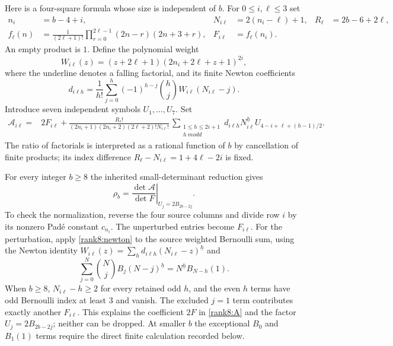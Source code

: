 \documentclass[11pt,letterpaper]{article}
\theoremstyle{definition}
\theoremstyle{remark}
\numberwithin{equation}{section}
\begin{document}
Here is a four-square formula whose size is independent of $b$.
For $0\le i,\ell\le3$ set
\begin{align*}
 n_i&=b-4+i,&N_{i\ell}&=2(n_i-\ell)+1,&R_\ell&=2b-6+2\ell,\\
 f_\ell(n)&=\frac1{(2\ell+1)!}
       \prod_{r=0}^{2\ell-1}(2n-r)(2n+3+r),&F_{i\ell}&=f_\ell(n_i).
\end{align*}
An empty product is $1$.  Define the polynomial weight
\[
 W_{i\ell}(z)=(z+2\ell+1)
                 (2n_i+2\ell+z+1)^{\underline{2i}},
\]
where the underline denotes a falling factorial, and its finite
Newton coefficients
\begin{equation}\label{rank8:newton}
 d_{i\ell h}=\frac1{h!}\sum_{j=0}^{h}
       (-1)^{h-j}\binom hj W_{i\ell}(N_{i\ell}-j).
\end{equation}
Introduce seven independent symbols $U_1,\ldots,U_7$.  Set
\begin{equation}\label{rank8:A}
 \begin{split}
 \mathcal A_{i\ell}={}&2F_{i\ell}+
 \frac{R_\ell!}
 {(2n_i+1)(2n_i+2)(2\ell+2)!N_{i\ell}!}\,
 \sum_{\substack{1\le h\le2i+1\\h\ {
m odd}}}
 d_{i\ell h}N_{i\ell}^{\underline h}
 U_{4-i+\ell+(h-1)/2}.
 \end{split}
\end{equation}
The ratio of factorials is interpreted as a rational function of $b$
by cancellation of finite products; its index difference
$R_\ell-N_{i\ell}=1+4\ell-2i$ is fixed.

For every integer $b\ge8$ the inherited small-determinant reduction
gives
\begin{equation}\label{rank8:ratio-small}
 \rho_b=
 \left.\frac{\det\mathcal A}{\det F}
 \right|_{U_j=2B_{2b-2j}}.
\end{equation}
To check the normalization, reverse the four source columns and
divide row $i$ by its nonzero Pad\'e constant $c_{n_i}$.  The
unperturbed entries become $F_{i\ell}$.  For the perturbation, apply
\eqref{rank8:newton} to the source weighted Bernoulli sum, using
the Newton identity
$W_{i\ell}(z)=\sum_h d_{i\ell h}(N_{i\ell}-z)^{\underline h}$
and
\[
 \sum_{j=0}^{N}\binom Nj B_j(N-j)^{\underline h}
      =N^{\underline h}B_{N-h}(1).
\]
When $b\ge8$, $N_{i\ell}-h\ge2$ for every retained odd $h$, and
the even $h$ terms have odd Bernoulli index at least $3$ and vanish.
The excluded $j=1$ term contributes exactly another $F_{i\ell}$.
This explains the coefficient $2F$ in \eqref{rank8:A} and the factor
$U_j=2B_{2b-2j}$; neither can be dropped.  At smaller $b$ the
exceptional $B_0$ and $B_1(1)$ terms require the direct finite
calculation recorded below.
\end{document}
